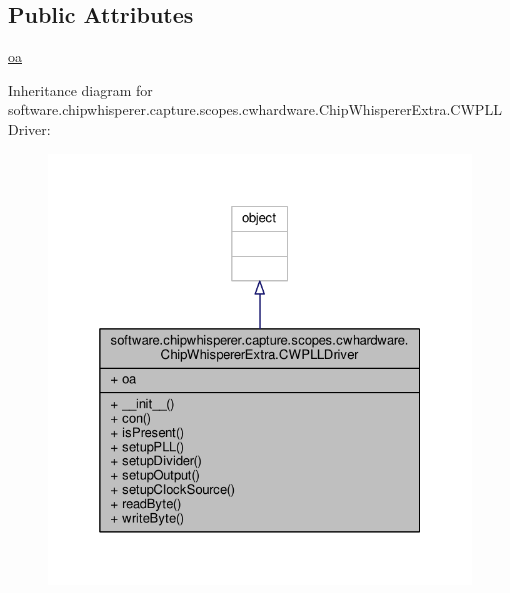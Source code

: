 \subsection*{Public Attributes}
\begin{DoxyCompactItemize}
\item 
\hyperlink{classsoftware_1_1chipwhisperer_1_1capture_1_1scopes_1_1cwhardware_1_1ChipWhispererExtra_1_1CWPLLDriver_a650f1d358411a7a3cc68cac107516d19}{oa}
\end{DoxyCompactItemize}


Inheritance diagram for software.\+chipwhisperer.\+capture.\+scopes.\+cwhardware.\+Chip\+Whisperer\+Extra.\+C\+W\+P\+L\+L\+Driver\+:\nopagebreak
\begin{figure}[H]
\begin{center}
\leavevmode
\includegraphics[width=325pt]{d4/df7/classsoftware_1_1chipwhisperer_1_1capture_1_1scopes_1_1cwhardware_1_1ChipWhispererExtra_1_1CWPLLDriver__inherit__graph}
\end{center}
\end{figure}


